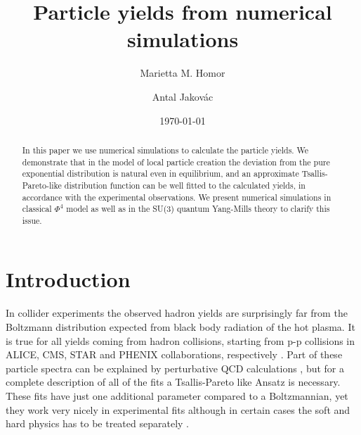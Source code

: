 \documentclass[aps,prd,twocolumn,showpacs,superscriptaddress,groupedaddress]{revtex4}  %
\begin{document}
\title{Particle yields from numerical simulations}

\author{Marietta M. Homor}
\author{Antal Jakov\'ac}

\date{\today}

\begin{abstract}
  In this paper we use numerical simulations to calculate the particle
  yields. We demonstrate that in the model of local particle creation
  the deviation from the pure exponential distribution is natural even in
  equilibrium, and an approximate Tsallis-Pareto-like distribution function
  can be well fitted to the calculated yields, in accordance with the
  experimental observations. We present numerical simulations in
  classical $\Phi^4$ model as well as in the SU(3) quantum Yang-Mills
  theory to clarify this issue.
\end{abstract}



\maketitle

\section{Introduction}

In collider experiments the observed hadron yields are surprisingly
far from the Boltzmann distribution expected from black body radiation
of the hot plasma. It is true for all yields coming from hadron
collisions, starting from p-p collisions in ALICE, CMS, STAR and
PHENIX collaborations, respectively
\cite{Aamodt:2011zj, Khachatryan:2010us, Abelev:2006cs, Adare:2011vy}. 
Part of these particle spectra can be explained by perturbative QCD
calculations \cite{pQCD}, but for a complete description of all of the
fits a Tsallis-Pareto \cite{TSPfit} like Ansatz is necessary.
 These fits have just one additional parameter compared to a Boltzmannian, yet they work very nicely in experimental fits
\cite{Khachatryan:2010us, Khachatryan:2010xs, Barnafoldi:2011zz, Cleymans:2011in}
although in certain cases the soft and hard physics has to be treated
separately \cite{Urmossy:2015kva}. 
\end{document}
